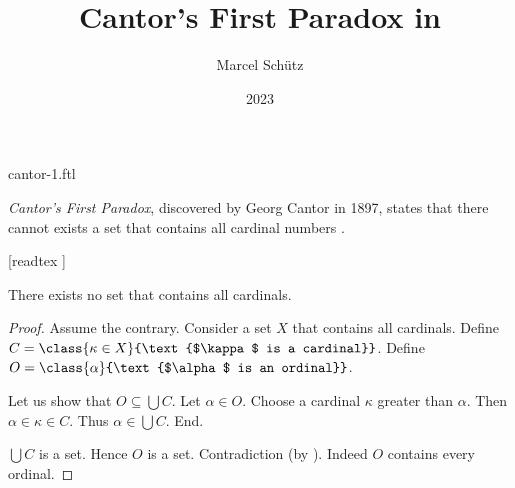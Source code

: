 \documentclass{stex}
\begin{document}
\title{Cantor's First Paradox in \Naproche}
\author{Marcel Schütz}
\date{2023}
\maketitle
\begin{smodule}{cantor-1.ftl}

  \noindent \emph{Cantor's First Paradox}, discovered by Georg Cantor in 1897, states that there cannot exists a set that contains all cardinal numbers \cite[chapter 156]{Cantor1991}.

  \begin{forthel}
    [readtex ]
  \end{forthel}

  \begin{forthel}
    \begin{theorem*}\label{cantor_paradox_1}
      There exists no set that contains all cardinals.
    \end{theorem*}
    \begin{proof}
      Assume the contrary.
      Consider a set $X$ that contains all cardinals.
      Define $C = \class{\kappa \in X}{\text{$\kappa$ is a cardinal}}$.
      Define $O = \class{\alpha}{\text{$\alpha$ is an ordinal}}$.

      Let us show that $O \subseteq \bigcup C$.
        Let $\alpha \in O$.
        Choose a cardinal $\kappa$ greater than $\alpha$.
        Then $\alpha \in \kappa \in C$.
        Thus $\alpha \in \bigcup C$.
      End.

      $\bigcup C$ is a set.
      Hence $O$ is a set.
      Contradiction (by ).
      Indeed $O$ contains every ordinal.
    \end{proof}
  \end{forthel}
\end{smodule}
\printbibliography
\end{document}
